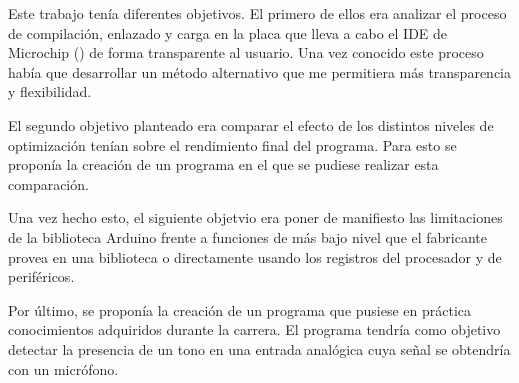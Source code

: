 Este trabajo tenía diferentes objetivos. El primero de ellos era analizar el proceso de compilación, enlazado y carga en la placa que lleva a cabo el IDE de Microchip () de forma transparente al usuario. Una vez conocido este proceso había que desarrollar un método alternativo que me permitiera más transparencia y flexibilidad.

El segundo objetivo planteado era comparar el efecto de los distintos niveles de optimización tenían sobre el rendimiento final del programa. Para esto se proponía la creación de un programa en el que se pudiese realizar esta comparación.

Una vez hecho esto, el siguiente objetvio era poner de manifiesto las limitaciones de la biblioteca Arduino frente a funciones de más bajo nivel que el fabricante provea en una biblioteca o directamente usando los registros del procesador y de periféricos.

Por último, se proponía la creación de un programa que pusiese en práctica conocimientos adquiridos durante la carrera. El programa tendría como objetivo detectar la presencia de un tono en una entrada analógica cuya señal se obtendría con un micrófono.

